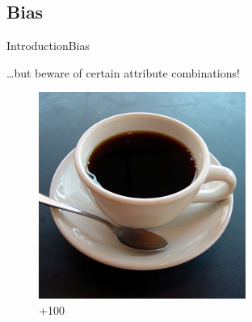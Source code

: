 \subsection{Bias}
\begin{frame}{Introduction}{Bias}

\ldots{}but beware of certain attribute combinations!
\vfill

\begin{figure}[ht]
\begin{minipage}[b]{0.26\linewidth}
\centering
\includegraphics[width=\textwidth]{img/introduction/coffee.png}
\\{\color{green}+100}
\end{minipage}
\hfill
\begin{minipage}[b]{0.26\linewidth}
\centering

\end{minipage}
\end{figure}
\end{frame}
